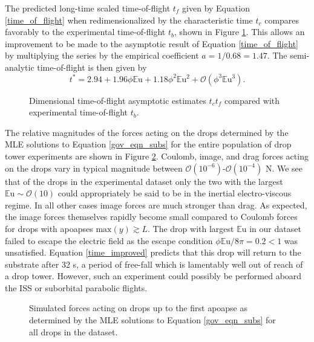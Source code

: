 \documentclass[aip,reprint, floatfix]{revtex4-1}
\begin{document}
The predicted long-time scaled time-of-flight $t_f$ given by Equation \ref{time_of_flight} when redimensionalized by the characteristic time $t_c$ compares favorably to the experimental time-of-flight $t_b$, shown in Figure \ref{fig:times2}. This allows an improvement to be made to the asymptotic result of Equation \ref{time_of_flight} by multiplying the series by the empirical coefficient $a = 1/0.68 = 1.47$. The semi-analytic time-of-flight is then given by
\begin{equation}
\label{time_improved}
t^* = 2.94 + 1.96\phi\mathbb{E}\mbox{u} + 1.18\phi^2\mathbb{E}\mbox{u}^{2} + \mathcal{O}(\phi^3\mathbb{E}\mbox{u}^{3}).
\end{equation}
\begin{figure}[htb]
    \centering
    \resizebox{0.5\textwidth}{!}{}
    \caption{Dimensional time-of-flight asymptotic estimates $t_c t_f$ compared with experimental time-of-flight $t_b$.\label{fig:times2}}
\end{figure}
The relative magnitudes of the forces acting on the drops determined by the MLE solutions to Equation \ref{gov_eqn_subs} for the entire population of drop tower experiments are shown in Figure \ref{fig:forces}. Coulomb, image, and drag forces acting on the drops vary in typical magnitude between $\mathcal{O}(10^{-6})$-$\mathcal{O}(10^{-4})$ N. We see that of the drops in the experimental dataset only the two with the largest $\mathbb{E}\mbox{u} \sim \mathcal{O}(10)$ could appropriately be said to be in the inertial electro-viscous regime. In all other cases image forces are much stronger than drag. As expected, the image forces themselves rapidly become small compared to Coulomb forces for drops with apoapses $\mbox{max}\left( y\right) \gtrsim L$. The drop with largest $\mathbb{E}\mbox{u}$ in our dataset failed to escape the electric field as the escape condition $\phi \mathbb{E}\mbox{u} / 8\pi = 0.2 < 1$ was unsatisfied. Equation \ref{time_improved} predicts that this drop will return to the substrate after 32 s, a period of free-fall which is lamentably well out of reach of a drop tower. However, such an experiment could possibly be performed aboard the ISS or suborbital parabolic flights.
\begin{figure}[!htb]
    \centering
    \resizebox{0.5\textwidth}{!}{}
    \caption{Simulated forces acting on drops up to the first apoapse as determined by the MLE solutions to Equation \ref{gov_eqn_subs} for all drops in the dataset.\label{fig:forces}}
\end{figure}
\end{document}
